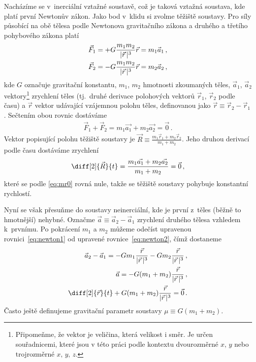 \documentclass[A4paper, 12pt, oneside]{book}
\begin{document}
Nacházíme se v~inerciální vztažné soustavě, což je taková vztažná soustava, kde platí první Newtonův zákon. Jako bod v~klidu si zvolme těžiště soustavy. Pro síly působící na obě tělesa podle Newtonova gravitačního zákona a druhého a třetího pohybového zákona platí
\begin{align} 
	\vec{F}_1 &= +G\frac{m_1m_2}{\lvert \vec{r} \,\rvert^3}\vec{r} = m_1\vec{a}_1\,, \label{eq:newton1} \\
	\vec{F}_2 &= -G\frac{m_1m_2}{\lvert \vec{r} \,\rvert^3}\vec{r} = m_2\vec{a}_2\,, \label{eq:newton2}
\end{align}
kde $G$ označuje gravitační konstantu, $m_1$, $m_2$ hmotnosti zkoumaných těles, $\vec{a}_1$, $\vec{a}_2$ vektory\footnote{Připomeňme, že vektor je veličina, která velikost i směr. Je určen souřadnicemi, které jsou v této práci podle kontextu dvourozměrné $x,\,y$ nebo trojrozměrné $x,\,y,\,z$.}  zrychlení těles (tj.\ druhé derivace polohových vektorů $\vec{r}_1$, $\vec{r}_2$ podle času) a $\vec{r}$ vektor udávající vzájemnou polohu těles, definovanou jako $\vec{r} \equiv \vec{r}_2 - \vec{r}_1$. Sečtením obou rovnic dostáváme
\begin{align} \label{eq:mr0}
	\vec{F}_1 + \vec{F}_2 = m_1\vec{a_1} + m_2\vec{a_2} = \vec{0}\,.
\end{align}
Vektor popisující polohu těžiště soustavy je $\vec{R} \equiv \frac{m_1\vec{r}_1 + m_2\vec{r}_2}{m_1 + m_2}$. Jeho druhou derivací podle času dostáváme zrychlení
\begin{align}
	\diff[2]{\vec{R}}{t} = \frac{m_1\vec{a_1} + m_2\vec{a_2}}{m_1+m_2} = \vec{0}\,,
\end{align}
které se podle \eqref{eq:mr0} rovná nule, takže se těžiště soustavy pohybuje konstantní rychlostí.

Nyní se však přesuňme do soustavy neinerciální, kde je první z~těles (běžně to hmotnější) nehybné. Označme $\vec{a}\equiv\vec{a}_2-\vec{a}_1$ zrychlení druhého tělesa vzhledem k~prvnímu. Po pokrácení $m_1$ a $m_2$ můžeme odečíst upravenou rovnici~\eqref{eq:newton1} od upravené rovnice~\eqref{eq:newton2}, čímž dostaneme
\begin{align}
	\nonumber \vec{a}_2 - \vec{a}_1 = -Gm_1\frac{\vec{r}}{\abs{\vec{r}}^3}-Gm_2\frac{\vec{r}}{\abs{\vec{r}}^3}\,, \\
	\nonumber \vec{a} = -G(m_1+m_2)\frac{\vec{r}}{\abs{\vec{r}}^3}\,, \\
		\diff[2]{\vec{r}}{t} + G(m_1+m_2)\frac{\vec{r}}{\abs{\vec{r}}^3} = \vec{0}\,. \label{eq:eqmotion}
\end{align}
Často ještě definujeme gravitační parametr soustavy $\mu\equiv G(m_1+m_2)$.
\end{document}
